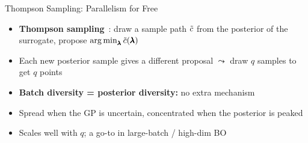 \documentclass[main]{subfiles}
\begin{document}
\begin{frame}[t]{Thompson Sampling: Parallelism for Free}
    \begin{itemize}
      \item \textbf{Thompson sampling}~: draw a sample path $\tilde{c}$ from the posterior of the surrogate, propose $\operatorname*{arg\,min}_{\pmb{\lambda}} \tilde{c}(\pmb{\lambda})$
      \item Each new posterior sample gives a different proposal $\leadsto$ draw $q$ samples to get $q$ points
      \item \textbf{Batch diversity = posterior diversity:} no extra mechanism
      \item Spread when the GP is uncertain, concentrated when the posterior is peaked
      \item Scales well with $q$; a go-to in large-batch / high-dim BO
    \end{itemize}
\end{frame}
\end{document}
